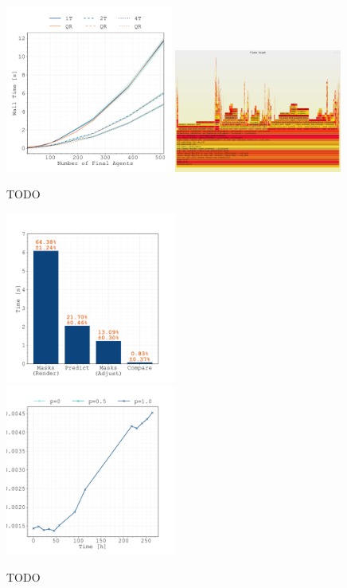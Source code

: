 \documentclass[10pt,letterpaper]{article}
\begin{document}
\begin{figure}
    \centering
    \includegraphics[width=0.49\textwidth]
        {docs/source/_static/performance/computation-time-with-initial-agents.pdf}
    \includegraphics[width=0.49\textwidth]{docs/source/_static/performance/flamegraph.pdf}
    \caption{TODO}
    \label{fig:performance}
\end{figure}

\begin{figure}
    \centering
    \includegraphics[width=0.5\textwidth]{figures/crm_divide/timings.pdf}%
    \includegraphics[width=0.5\textwidth]{figures/crm_divide/time-evolution.pdf}%
    \caption{TODO}
    \label{fig:timings-crm_divide}
\end{figure}

\label{LastPage}
\end{document}
